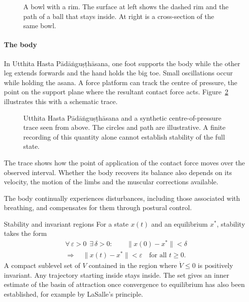 \begin{figure}
\caption{A bowl with a rim. The surface at left shows the dashed rim and the path of a ball that stays inside. At right is a cross-section of the same bowl.}
\label{fig:cratere}
\end{figure}

\paragraph{The body} In Utthita Hasta Pādāṅguṣṭhāsana, one foot supports the body while the other leg extends forwards and the hand holds the big toe. Small oscillations occur while holding the asana. A force platform can track the centre of pressure, the point on the support plane where the resultant contact force acts. Figure~\ref{fig:uhp} illustrates this with a schematic trace.

\begin{figure}
\caption{Utthita Hasta Pādāṅguṣṭhāsana and a synthetic centre-of-pressure trace seen from above. The circles and path are illustrative. A finite recording of this quantity alone cannot establish stability of the full state.}
\label{fig:uhp}
\end{figure}

The trace shows how the point of application of the contact force moves over the observed interval. Whether the body recovers its balance also depends on its velocity, the motion of the limbs and the muscular corrections available.

The body continually experiences disturbances, including those associated with breathing, and compensates for them through postural control.

\begin{formule}{Stability and invariant regions}
For a state $x(t)$ and an equilibrium $x^\ast$, stability takes the form
\[
\begin{gathered}
\forall\,\varepsilon>0\ \ \exists\,\delta>0:\qquad
\lVert x(0)-x^\ast\rVert<\delta \\
\Longrightarrow\quad \lVert x(t)-x^\ast\rVert<\varepsilon
\quad \text{for all } t\ge 0 .
\end{gathered}
\]
A compact sublevel set of $V$ contained in the region where $\dot V\le0$ is positively invariant. Any trajectory starting inside stays inside. The set gives an inner estimate of the basin of attraction once convergence to equilibrium has also been established, for example by LaSalle's principle.
\end{formule}

